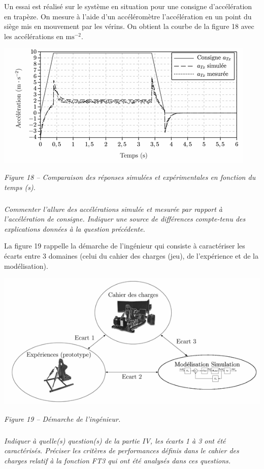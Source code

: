 \documentclass[10pt,fleqn]{article} %
\begin{document}
Un essai est réalisé sur le système en situation pour une consigne d'accélération en trapèze. 
On mesure à l'aide d'un accéléromètre l'accélération en un point du siège mis en mouvement par les vérins. On obtient la courbe de la figure 18 avec les accélérations en $\text{ms}^{-2}$. 


\begin{center}
\includegraphics[width=.9\linewidth]{images/fig_18}

\textit{Figure 18 -- Comparaison des réponses simulées et expérimentales en fonction du temps (s).}
\end{center}

\subparagraph{}
\textit{Commenter l'allure des accélérations simulée et mesurée par rapport à l'accélération de consigne. Indiquer une source de différences compte-tenu des explications données à la question précédente.}

La figure 19 rappelle la démarche de l'ingénieur qui consiste à caractériser les écarts entre 3 domaines (celui du cahier des charges (jeu), de l'expérience et de la modélisation). 

\begin{center}
\includegraphics[width=.9\linewidth]{images/fig_19}

\textit{Figure 19 -- Démarche de l'ingénieur.}
\end{center}


\subparagraph{}
\textit{Indiquer à quelle(s) question(s) de la partie IV, les écarts 1 à 3 ont été caractérisés. Préciser les critères de performances définis dans le cahier des charges relatif à la fonction FT3 qui ont été analysés dans ces questions.}
\end{document}
